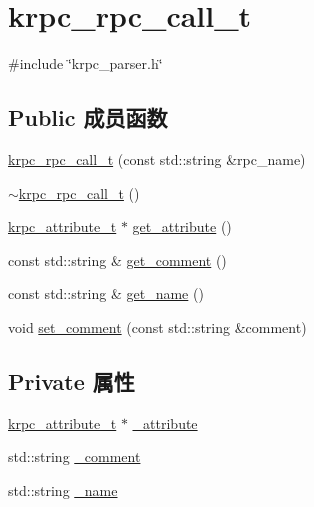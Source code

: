 \hypertarget{classkrpc__rpc__call__t}{}\section{krpc\+\_\+rpc\+\_\+call\+\_\+t}
\label{classkrpc__rpc__call__t}


{\ttfamily \#include \char`\"{}krpc\+\_\+parser.\+h\char`\"{}}

\subsection*{Public 成员函数}
\begin{DoxyCompactItemize}
\item 
\hyperlink{classkrpc__rpc__call__t_a6e534e6450d5f5978eae8eaca907af91}{krpc\+\_\+rpc\+\_\+call\+\_\+t} (const std\+::string \&rpc\+\_\+name)
\item 
\hyperlink{classkrpc__rpc__call__t_adaf2529445b9d925e65c0a161bea278b}{$\sim$krpc\+\_\+rpc\+\_\+call\+\_\+t} ()
\item 
\hyperlink{classkrpc__attribute__t}{krpc\+\_\+attribute\+\_\+t} $\ast$ \hyperlink{classkrpc__rpc__call__t_afcb940e2481f4c462f374fc4e448d264}{get\+\_\+attribute} ()
\item 
const std\+::string \& \hyperlink{classkrpc__rpc__call__t_a9128f194c67e1d230e12148e0666388b}{get\+\_\+comment} ()
\item 
const std\+::string \& \hyperlink{classkrpc__rpc__call__t_af5cb61288c449788539272f080c1d142}{get\+\_\+name} ()
\item 
void \hyperlink{classkrpc__rpc__call__t_aa6968b6cbbeffbe137669a2d831a0503}{set\+\_\+comment} (const std\+::string \&comment)
\end{DoxyCompactItemize}
\subsection*{Private 属性}
\begin{DoxyCompactItemize}
\item 
\hyperlink{classkrpc__attribute__t}{krpc\+\_\+attribute\+\_\+t} $\ast$ \hyperlink{classkrpc__rpc__call__t_adb625ed5a77fc43b54d6f2ab132a9ca7}{\+\_\+attribute}
\item 
std\+::string \hyperlink{classkrpc__rpc__call__t_a8023a5250068c80d006205154d89046f}{\+\_\+comment}
\item 
std\+::string \hyperlink{classkrpc__rpc__call__t_aaf2ed934b37cbbd236fdd1b01a5f5005}{\+\_\+name}
\end{DoxyCompactItemize}


